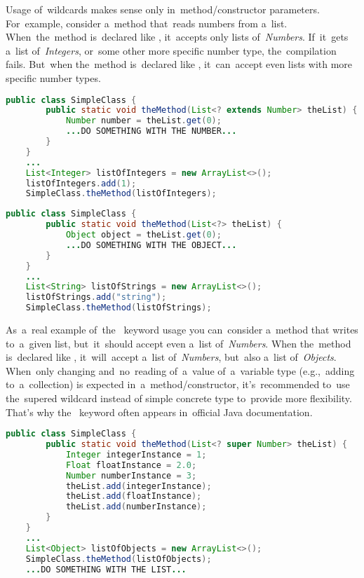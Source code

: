 Usage of~wildcards makes sense only in~method/constructor parameters.
For~example, consider a~method that~reads numbers from a~list.
When~the~method is~declared like , it~accepts only lists \mbox{of \textit{Numbers}}.
If~it~gets a~list \mbox{of \textit{Integers}},  or~some other more specific number type, the~compilation fails.
But~when the~method is~declared like , it~can~accept even lists with more specific number types.
\newpage

\begin{lstlisting}[language=Java]
    public class SimpleClass {
        public static void theMethod(List<? extends Number> theList) {
            Number number = theList.get(0);
            ...DO SOMETHING WITH THE NUMBER...
        }
    }
    ...
    List<Integer> listOfIntegers = new ArrayList<>();
    listOfIntegers.add(1);
    SimpleClass.theMethod(listOfIntegers);
\end{lstlisting}
\begin{lstlisting}[language=Java]
    public class SimpleClass {
        public static void theMethod(List<?> theList) {
            Object object = theList.get(0);
            ...DO SOMETHING WITH THE OBJECT...
        }
    }
    ...
    List<String> listOfStrings = new ArrayList<>();
    listOfStrings.add("string");
    SimpleClass.theMethod(listOfStrings);
\end{lstlisting}
\newline

\noindent As~a~real example \mbox{of the } keyword usage you can~consider a~method that writes  to~a~given list, but~it~should accept even a~list \mbox{of \textit{Numbers}}.
When the~method is~declared like , it~will~accept a~list \mbox{of \textit{Numbers}}, but~also a~list \mbox{of \textit{Objects}}.
When~only changing and~no~reading of~a~value of~a~variable type (e.g.,~adding to~a~collection) is expected in~a~method/constructor, it's~recommended to~use the~supered wildcard instead of simple concrete type to~provide more flexibility.
That's why the~ keyword often appears in~official Java documentation.
\newpage

\begin{lstlisting}[language=Java]
    public class SimpleClass {
        public static void theMethod(List<? super Number> theList) {
            Integer integerInstance = 1;
            Float floatInstance = 2.0;
            Number numberInstance = 3;
            theList.add(integerInstance);
            theList.add(floatInstance);
            theList.add(numberInstance);
        }
    }
    ...
    List<Object> listOfObjects = new ArrayList<>();
    SimpleClass.theMethod(listOfObjects);
    ...DO SOMETHING WITH THE LIST...
\end{lstlisting}

